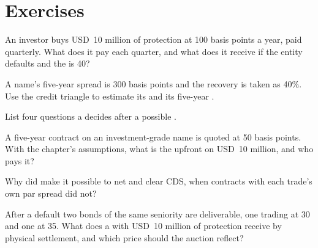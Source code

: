 \section{Exercises}

\begin{exercise}[$\star$]\label{exo:m2:credit-default-swaps:1}
An investor buys USD~10 million of protection at 100 basis points a year, paid
quarterly. What does it pay each quarter, and what does it receive if the entity
defaults and the  is 40?
\end{exercise}

\begin{exercise}[$\star$]\label{exo:m2:credit-default-swaps:2}
A name's five-year spread is 300 basis points and the recovery is taken as 40\%. Use
the credit triangle to estimate its  and its five-year .
\end{exercise}

\begin{exercise}[$\star$]\label{exo:m2:credit-default-swaps:3}
List four questions a  decides after a possible .
\end{exercise}

\begin{exercise}[$\star\star$]\label{exo:m2:credit-default-swaps:4}
A five-year contract on an investment-grade name is quoted at 50 basis points. With the
chapter's assumptions, what is the upfront on USD~10 million, and who pays it?
\end{exercise}

\begin{exercise}[$\star\star$]\label{exo:m2:credit-default-swaps:5}
Why did  make it possible to net and clear CDS, when contracts with
each trade's own par spread did not?
\end{exercise}

\begin{exercise}[$\star\star$]\label{exo:m2:credit-default-swaps:6}
After a default two bonds of the same seniority are deliverable, one trading at 30 and
one at 35. What does a  with USD~10 million of protection receive by
physical settlement, and which price should the auction reflect?
\end{exercise}

